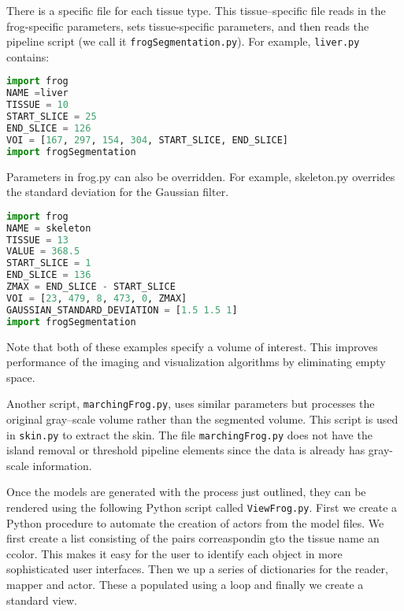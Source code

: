 \noindent There is a specific file for each tissue type. This tissue--specific file reads in the frog-specific parameters, sets tissue-specific parameters, and then reads the pipeline script (we call it  \texttt{frogSegmentation.py}). For example, \texttt{liver.py} contains:

\begin{lstlisting}[language=Python, caption={Tissue specific file.}]
import frog
NAME =liver
TISSUE = 10
START_SLICE = 25
END_SLICE = 126
VOI = [167, 297, 154, 304, START_SLICE, END_SLICE]
import frogSegmentation
\end{lstlisting}

\noindent Parameters in frog.py can also be overridden. For example, skeleton.py overrides the standard deviation for the Gaussian filter.

\begin{lstlisting}[language=Python, caption={Overriding parameters.}]
import frog
NAME = skeleton
TISSUE = 13
VALUE = 368.5
START_SLICE = 1
END_SLICE = 136
ZMAX = END_SLICE - START_SLICE
VOI = [23, 479, 8, 473, 0, ZMAX]
GAUSSIAN_STANDARD_DEVIATION = [1.5 1.5 1]
import frogSegmentation
\end{lstlisting}

\noindent Note that both of these examples specify a volume of interest. This improves performance of the imaging and visualization algorithms by eliminating empty space.

Another script, \texttt{marchingFrog.py}, uses similar parameters but processes the original gray--scale volume rather than the segmented volume. This script is used in \texttt{skin.py} to extract the skin. The file \texttt{marchingFrog.py} does not have the island removal or threshold pipeline elements since the data is already has gray-scale information.

Once the models are generated with the process just outlined, they can be rendered using the following Python script called \texttt{ViewFrog.py}. First we create a Python procedure to automate the creation of actors from the model files. We first create a list consisting of the pairs correaspondin gto the tissue name an ccolor. This makes it easy for the user to identify each object in more sophisticated user interfaces. Then we up a series of dictionaries for the reader, mapper and actor. These a populated using a loop and finally we create a standard view.

